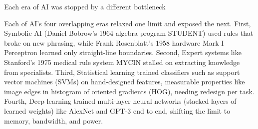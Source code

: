 \documentclass[aspectratio=169, 12pt]{beamer}
\begin{document}
\begin{frame}{Each era of AI was stopped by a different bottleneck}
{    Each of AI's four overlapping eras relaxed one limit and exposed the next. First, Symbolic AI (Daniel Bobrow's 1964 algebra program STUDENT) used rules that broke on new phrasing, while Frank Rosenblatt's 1958 hardware Mark I Perceptron learned only straight-line boundaries. Second, Expert systems like Stanford's 1975 medical rule system MYCIN stalled on extracting knowledge from specialists. Third, Statistical learning trained classifiers such as support vector machines (SVMs) on hand-designed features, measurable properties like image edges in histogram of oriented gradients (HOG), needing redesign per task. Fourth, Deep learning trained multi-layer neural networks (stacked layers of learned weights) like AlexNet and GPT-3 end to end, shifting the limit to memory, bandwidth, and power.



  }
\end{frame}
\end{document}
